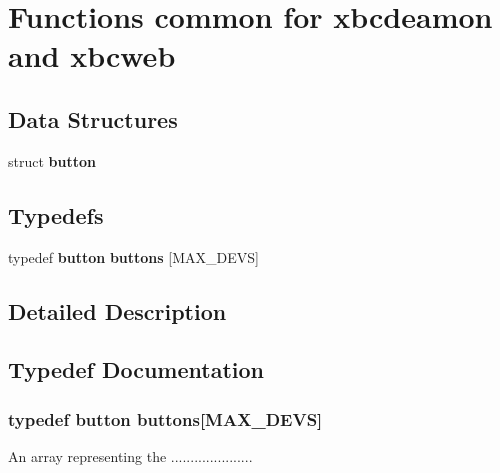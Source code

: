 \section{Functions common for xbcdeamon and xbcweb}
\label{group__common}
\subsection*{Data Structures}
\begin{DoxyCompactItemize}
\item 
struct {\bf button}
\end{DoxyCompactItemize}
\subsection*{Typedefs}
\begin{DoxyCompactItemize}
\item 
typedef {\bf button} {\bf buttons} [M\-A\-X\-\_\-\-D\-E\-V\-S]
\end{DoxyCompactItemize}


\subsection{Detailed Description}


\subsection{Typedef Documentation}
\subsubsection[{buttons}]{\setlength{\rightskip}{0pt plus 5cm}typedef {\bf button} buttons[M\-A\-X\-\_\-\-D\-E\-V\-S]}\label{group__common_ga0e4bedda1c8dd76f7771ff7a66ab7faf}
An array representing the ..................... 